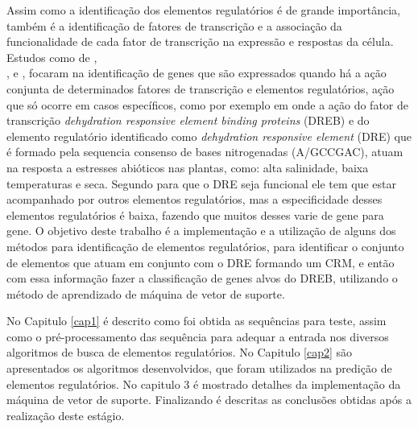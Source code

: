 Assim como a identificação dos elementos regulatórios é de grande importância, também é a identificação de fatores de transcrição e a associação da funcionalidade de cada fator de transcrição na expressão e respostas da célula. Estudos como de \cite{Holloway2008}, \\ \cite{Lan2007},\cite{Zhang2005} e \cite{Bigelow2004CisOrtho}, focaram na identificação de genes que são expressados quando há a ação conjunta de determinados fatores de transcrição e elementos regulatórios, ação que só ocorre em casos específicos, como por exemplo em \cite{Wang2009} onde a ação do fator de transcrição \textit{dehydration responsive element binding proteins} (DREB) e do elemento regulatório identificado como \textit{dehydration responsive element} (DRE) que é formado pela sequencia consenso de bases nitrogenadas (A/GCCGAC), atuam na resposta a estresses abióticos nas plantas, como: alta salinidade, baixa temperaturas e seca. Segundo \cite{Zhang2005} para que o DRE seja funcional ele tem que estar acompanhado por outros elementos regulatórios, mas a especificidade desses elementos regulatórios é baixa, fazendo que muitos desses varie de gene para gene. O objetivo deste trabalho é a implementação e a utilização de alguns dos métodos para identificação de elementos regulatórios, para identificar o conjunto de elementos que atuam em conjunto com o DRE formando um CRM, e então com essa informação fazer a classificação de genes alvos do DREB, utilizando o método de aprendizado de máquina de vetor de suporte.

No Capitulo \ref{cap1} é descrito como foi obtida as sequências para teste, assim como o pré-processamento das sequência para adequar a entrada nos diversos algoritmos de busca de elementos regulatórios. No Capitulo \ref{cap2} são apresentados os algoritmos desenvolvidos, que foram utilizados na predição de elementos regulatórios. No capitulo 3 é mostrado detalhes da implementação da máquina de vetor de suporte. Finalizando é descritas as conclusões obtidas após a realização deste estágio.